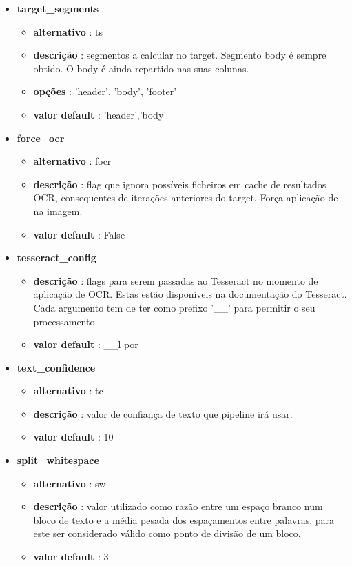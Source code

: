\begin{itemize}
	\item \textbf{target\_segments}
		\begin{itemize}\setlength\itemsep{-0.5em}
			\item \textbf{alternativo} : ts
			\item \textbf{descrição} : segmentos a calcular no target. Segmento body é sempre obtido. O body é ainda repartido nas suas colunas.
			\item \textbf{opções} : 'header', 'body', 'footer'
			\item \textbf{valor default} : 'header','body'
		\end{itemize}
		
	\item \textbf{force\_ocr}
		\begin{itemize}\setlength\itemsep{-0.5em}
			\item \textbf{alternativo} : focr
			\item \textbf{descrição} : flag que ignora possíveis ficheiros em cache de resultados OCR, consequentes de iterações anteriores do target. Força aplicação de na imagem.
			\item \textbf{valor default} : False
		\end{itemize}
		
	\item \textbf{tesseract\_config}
		\begin{itemize}\setlength\itemsep{-0.5em}
			\item \textbf{descrição} : flags para serem passadas ao Tesseract no momento de aplicação de OCR. Estas estão disponíveis na documentação do Tesseract. Cada argumento tem de ter como prefixo '\_\_' para permitir o seu processamento.
			\item \textbf{valor default} : \_\_l por
		\end{itemize}
	
	\item \textbf{text\_confidence}
		\begin{itemize}\setlength\itemsep{-0.5em}
			\item \textbf{alternativo} : tc
			\item \textbf{descrição} : valor de confiança de texto que pipeline irá usar.
			\item \textbf{valor default} : 10
		\end{itemize}
	
	
	\item \textbf{split\_whitespace}
		\begin{itemize}\setlength\itemsep{-0.5em}
			\item \textbf{alternativo} : sw
			\item \textbf{descrição} : valor utilizado como razão entre um espaço branco num bloco de texto e a média pesada dos espaçamentos entre palavras, para este ser considerado válido como ponto de divisão de um bloco.
			\item \textbf{valor default} : 3
		\end{itemize}
	

\end{itemize}
